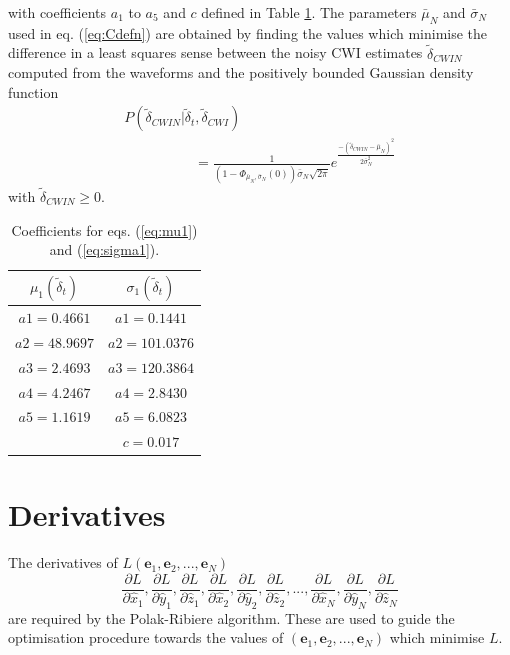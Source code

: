 \documentclass[extra]{gji}
\begin{document}
with coefficients $a_1$ to $a_5$ and $c$ defined in Table \ref{tab-const4-mu1-sigma1}.
The parameters $\bar{\mu}_N$ and $\bar{\sigma}_N$ used in
eq. (\ref{eq:Cdefn}) are obtained by finding the values which minimise the
difference in a least squares sense between the noisy CWI estimates $\widetilde{\delta}_{CWIN}$
computed from the waveforms and the
positively bounded Gaussian density function
\begin{equation}
\label{eq-likelihood-noisydata-pdf-orig}
\begin{array}{l}
P(\widetilde{\delta}_{CWIN}|\widetilde{\delta}_t,\widetilde{\delta}_{CWI}) \\
\hspace{5em} = \frac{1}{\left(1-\Phi_{\bar{\mu}_N,\bar{\sigma}_N}(0)\right)\bar{\sigma}_N\sqrt{2\pi}}
e^{  \frac{-(\widetilde{\delta}_{CWIN}-\bar{\mu}_N)^2}{2\bar{\sigma}_N^2}  }
\end{array}
\end{equation}
with $\widetilde{\delta}_{CWIN} \geq 0$.


\begin{table}
\caption{Coefficients for eqs. (\ref{eq:mu1}) and (\ref{eq:sigma1}).}
\label{tab-const4-mu1-sigma1}
\begin{tabular}{|c|c|}
\hline
$\mu_1(\widetilde{\delta}_t)$ & $\sigma_1(\widetilde{\delta}_t)$ \\
\hline
$a1 = 0.4661$ & $a1 = 0.1441$\\
$a2 = 48.9697$ & $a2 = 101.0376$\\
$a3 = 2.4693$ & $a3 = 120.3864$\\
$a4 = 4.2467$ & $a4 = 2.8430$\\
$a5 = 1.1619$ & $a5 = 6.0823$ \\
     & $c = 0.017$ \\
\hline
\end{tabular}
\end{table}


\section{Derivatives}
\label{sec-Appendix-derivatives_ofL}

The derivatives of $L(\mathbf{e}_1,\mathbf{e}_2,...,\mathbf{e}_N)$
\begin{equation}
\frac{\partial L}{\partial \hat{x}_1},
\frac{\partial L}{\partial \hat{y}_1},
 \frac{\partial L}{\partial \hat{z}_1},
\frac{\partial L}{\partial \hat{x}_2},
\frac{\partial L}{\partial \hat{y}_2},
\frac{\partial L}{\partial \hat{z}_2},
...,
\frac{\partial L}{\partial \hat{x}_N},
\frac{\partial L}{\partial \hat{y}_N},
\frac{\partial L}{\partial \hat{z}_N}
\end{equation}
are required by the Polak-Ribiere algorithm. These are used to guide the optimisation procedure
towards the values of $(\mathbf{e}_1,\mathbf{e}_2,...,\mathbf{e}_N)$ which
minimise $L$.
\end{document}
